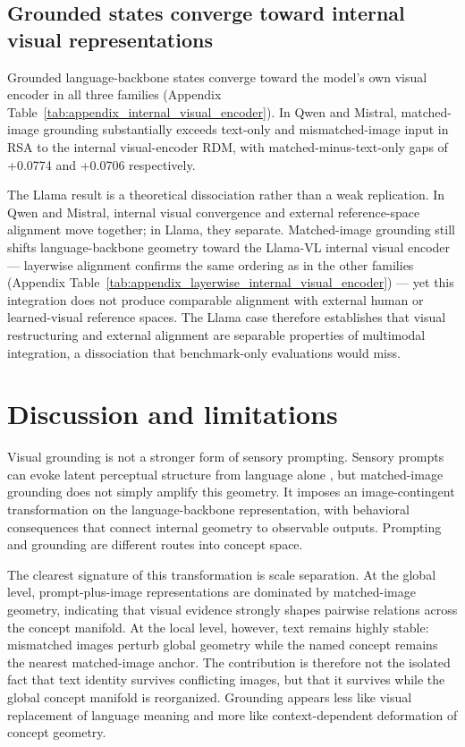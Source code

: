 \documentclass{article}
\begin{document}
\subsection{Grounded states converge toward internal visual representations}
\label{sec:internal_visual_encoder}

Grounded language-backbone states converge toward the model's own visual encoder in all three families (Appendix Table~\ref{tab:appendix_internal_visual_encoder}). In Qwen and Mistral, matched-image grounding substantially exceeds text-only and mismatched-image input in RSA to the internal visual-encoder RDM, with matched-minus-text-only gaps of +0.0774 and +0.0706 respectively.

The Llama result is a theoretical dissociation rather than a weak replication. In Qwen and Mistral, internal visual convergence and external reference-space alignment move together; in Llama, they separate. Matched-image grounding still shifts language-backbone geometry toward the Llama-VL internal visual encoder --- layerwise alignment confirms the same ordering as in the other families (Appendix Table~\ref{tab:appendix_layerwise_internal_visual_encoder}) --- yet this integration does not produce comparable alignment with external human or learned-visual reference spaces. The Llama case therefore establishes that visual restructuring and external alignment are separable properties of multimodal integration, a dissociation that benchmark-only evaluations would miss.

\section{Discussion and limitations}

Visual grounding is not a stronger form of sensory prompting. Sensory prompts can evoke latent perceptual structure from language alone \citep{wang2025words}, but matched-image grounding does not simply amplify this geometry. It imposes an image-contingent transformation on the language-backbone representation, with behavioral consequences that connect internal geometry to observable outputs. Prompting and grounding are different routes into concept space.

The clearest signature of this transformation is scale separation. At the global level, prompt-plus-image representations are dominated by matched-image geometry, indicating that visual evidence strongly shapes pairwise relations across the concept manifold. At the local level, however, text remains highly stable: mismatched images perturb global geometry while the named concept remains the nearest matched-image anchor. The contribution is therefore not the isolated fact that text identity survives conflicting images, but that it survives while the global concept manifold is reorganized. Grounding appears less like visual replacement of language meaning and more like context-dependent deformation of concept geometry.
\end{document}
